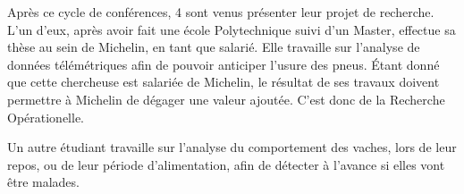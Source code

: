 \documentclass[14pt, a4paper]{report}
\begin{document}

Après ce cycle de conférences, 4 sont venus présenter leur projet de recherche.
L'un d'eux, après avoir fait une école Polytechnique suivi d'un Master, effectue sa thèse au sein de Michelin, en tant que salarié. Elle travaille sur l'analyse de données télémétriques afin de pouvoir anticiper l'usure des pneus. Étant donné que cette chercheuse est salariée de Michelin, le résultat de ses travaux doivent permettre à Michelin de dégager une valeur ajoutée. C'est donc de la Recherche Opérationelle.


Un autre étudiant travaille sur l'analyse du comportement des vaches, lors de leur repos, ou de leur période d'alimentation, afin de détecter à l'avance si elles vont être malades.
\end{document}
